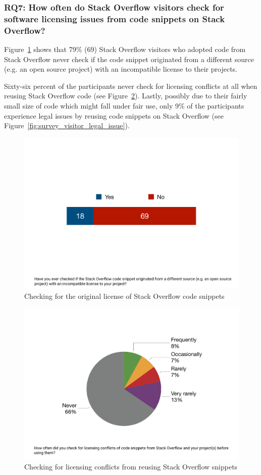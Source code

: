 \documentclass{svjour3}                     %
\begin{document}
\subsubsection*{RQ7: How often do Stack Overflow visitors check for software licensing issues from code snippets on Stack Overflow?}

Figure~\ref{fig:survey_visitor_original_license} shows that 79\% (69) Stack
Overflow visitors who adopted code from Stack Overflow never check if the code
snippet originated from a different source (e.g. an open source project) with an
incompatible license to their projects. 

Sixty-six percent of the participants never
check for licensing conflicts at all when reusing Stack Overflow code (see Figure~\ref{fig:survey_visitor_licensing_conflict_check}). Lastly,
possibly due to their fairly small size of code which might fall under fair use,
only 9\% of the participants experience legal issues by reusing code snippets on
Stack Overflow (see Figure~\ref{fig:survey_visitor_legal_issue}).

\begin{figure} \centering
	\includegraphics[width=.4\linewidth]{survey_visitor_original_license} 
	\caption{Checking for the original license of Stack Overflow code snippets}
	\label{fig:survey_visitor_original_license} 
\end{figure}

\begin{figure} \centering
	\includegraphics[width=.4\linewidth]{survey_visitor_licensing_conflict_check} 
	\caption{Checking for licensing conflicts from reusing Stack Overflow snippets}
	\label{fig:survey_visitor_licensing_conflict_check} 
\end{figure}
\end{document}
